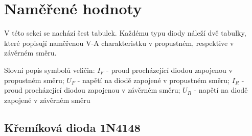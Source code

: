 \documentclass[a4paper, czech]{article}
\begin{document}
\section[short]{Naměřené hodnoty}
V této sekci se nachází šest tabulek. Každému typu diody náleží dvě tabulky, které popisují naměřenou V-A charakteristku v propustném, respektive v závěrném směru.

Slovní popis symbolů veličin:
$I_F$ - proud procházející diodou zapojenou v propustném směru;
$U_F$ - napětí na diodě zapojené v propustném směru;
$I_R$ - proud procházející diodou zapojenou v závěrném směru;
$U_R$ - napětí na diodě zapojené v závěrném směru

\subsection[short]{Křemíková dioda 1N4148}
\begin{table}[H]
  \caption{Naměřené hodnoty V-A charakteristiky diody 1N4148 v \underline{propustném} směru}
  \label{tab:1}
\end{table}

\begin{table}[H]
  \caption{Naměřené hodnoty V-A charakteristiky diody 1N4148 v \underline{závěrném} směru}
  \label{tab:2}
\end{table}
\end{document}
